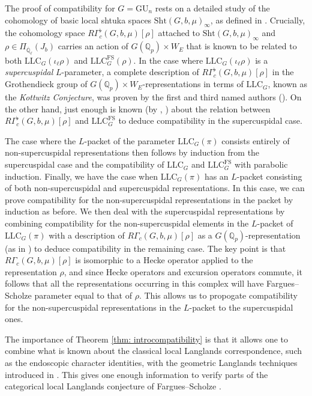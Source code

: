 \documentclass[reqno,11pt]{amsart}
\theoremstyle{remark}
\newcommand{\GU}{\mathrm{GU}}
\newcommand{\Q}{\mathbb{Q}}
\newcommand{\ov}{\overline}
\newcommand{\Sht}{\mathrm{Sht}}
\newcommand{\LLC}{\mathrm{LLC}}
\begin{document}
The proof of compatibility for $G = \GU_n$ rests on a detailed study of the cohomology of basic local shtuka spaces $\Sht(G,b,\mu)_{\infty}$, as defined in \cite[Lecture~23]{SW}. Crucially, the cohomology space $R\Gamma^{\flat}_c(G,b,\mu)[\rho]$ attached to $\Sht(G,b,\mu)_{\infty}$ and $\rho \in \Pi_{\ov{\Q}_{\ell}}(J_b)$ carries an action of $G(\Q_p) \times W_E$ that is known to be related to both $\LLC_G(\iota_{\ell}\rho)$ and $\LLC^{\mathrm{FS}}_G(\rho)$. In the case where $\LLC_G(\iota_{\ell}\rho)$ is a \emph{supercuspidal} $L$-parameter, a complete description of $R\Gamma^{\flat}_c(G,b,\mu)[\rho]$ in the Grothendieck group of $G(\mathbb{Q}_{p}) \times W_{E}$-representations in terms of $\LLC_G$, known as the \emph{Kottwitz Conjecture}, was proven by the first and third named authors (\cite[Theorem 6.1]{BMN}). On the other hand, just enough is known (by \cite{Ko}, \cite{Ham}) about the relation between $R\Gamma^{\flat}_c(G,b,\mu)[\rho]$ and $\LLC^{\mathrm{FS}}_{G}$ to deduce compatibility in the supercuspidal case. 

The case where the $L$-packet of the parameter $\LLC_G(\pi)$ consists entirely of non-supercuspidal representations then follows by induction from the supercuspidal case and the compatibility of $\LLC_G$ and $\LLC^{\mathrm{FS}}_G$ with parabolic induction. Finally, we have the case when $\LLC_G(\pi)$ has an $L$-packet consisting of both non-supercuspidal and supercuspidal representations. In this case, we can prove compatibility for the non-supercuspidal representations in the packet by induction as before. We then deal with the supercuspidal representations by combining compatibility for the non-supercuspidal elements in the $L$-packet of $\LLC_G(\pi)$ with a description of $R\Gamma_c(G,b,\mu)[\rho]$ as a $G(\Q_p)$-representation (as in \cite{HKW}) to deduce compatibility in the remaining case. The key point is that $R\Gamma_{c}(G,b,\mu)[\rho]$ is isomorphic to a Hecke operator applied to the representation $\rho$, and since Hecke operators and excursion operators commute, it follows that all the representations occurring in this complex will have Fargues--Scholze parameter equal to that of $\rho$. This allows us to propogate compatibility for the non-supercuspidal representations in the $L$-packet to the supercuspidal ones. 

The importance of Theorem \ref{thm: introcompatibility} is that it allows one to combine what is known about the classical local Langlands correspondence, such as the endoscopic character identities, with the geometric Langlands techniques introduced in \cite{FS}. This gives one enough information to verify parts of the categorical local Langlands conjecture of Fargues--Scholze \cite[Conjecture~X.I.4]{FS}. 
\end{document}
